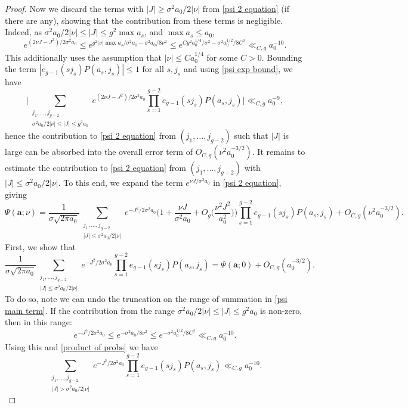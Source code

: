\documentclass[hidelinks,11pt,reqno]{amsart}
\renewcommand{\leq}{\leqslant}
\renewcommand{\geq}{\geqslant}
\newcommand{\ru}[1]{e_{g-1}(#1)}
\theoremstyle{remark}
\begin{document}
\begin{proof}
    Now we discard the terms with $|J|\geq \sigma^{2}a_{0}/2|\nu|$ from \cref{psi 2 equation} (if there are any), showing that the contribution from these terms is negligible. Indeed, as $\sigma^{2}a_{0}/2|\nu|\leq |J|\leq g^{2}\max a_{s}$, and $\max a_{s}\leq a_{0}$,
    \begin{equation}\label{psi exp bound}
        e^{(2\nu J-J^{2})/2\sigma^{2}a_{0}}\leq e^{g^{2}|\nu|\max a_{s}/\sigma^{2}a_{0} -\sigma^{2}a_{0}/8\nu^{2}}\leq e^{Cg^{2}a_{0}^{1/4}/\sigma^{2}-\sigma^{2}a_{0}^{1/2}/8C^{2}}\ll_{C,g} a_{0}^{-10}.
    \end{equation}
    This additionally uses the assumption that $|\nu|\leq Ca_{0}^{1/4}$ for some $C>0$. Bounding the term $|\ru{sj_{s}}P(a_{s},j_{s})|\leq 1$ for all $s, j_{s}$ and using \cref{psi exp bound}, we have
    \[\Big | \sum_{\substack{j_{1},\ldots, j_{g-2}\\ \sigma^{2}a_{0}/2|\nu|\leq|J|\leq g^{2}a_{0}}} e^{(2\nu J-J^{2})/2\sigma^{2}a_{0}}\prod_{s=1}^{g-2}\ru{sj_{s}}P(a_{s},j_{s})\Big |\ll_{C,g} a_{0}^{-9},\]
    hence the contribution to \cref{psi 2 equation} from $(j_{1},\ldots, j_{g-2})$ such that $|J|$ is large can be absorbed into the overall error term of $O_{C,g}(\nu^{2}a_{0}^{-3/2})$. It remains to estimate the contribution to \cref{psi 2 equation} from $(j_{1},\ldots, j_{g-2}) $ with $|J|\leq \sigma^{2}a_{0}/2|\nu|$. To this end, we expand the term $e^{\nu J/\sigma^{2}a_{0}}$ in \cref{psi 2 equation}, giving
    \begin{equation}\label{psi proof eq}
        \Psi(\mathbf{a};\nu)=\frac{1}{\sigma\sqrt{2\pi a_{0}}}\sum_{\substack{j_{1},\ldots, j_{g-2}\\|J|\leq \sigma^{2}a_{0}/2|\nu|}}e^{-J^{2}/2\sigma^{2}a_{0}}\Big (1+\frac{\nu J}{\sigma^{2}a_{0}}+O_{g}\Big(\frac{\nu^{2}J^{2}}{a_{0}^{2}}\Big)\Big )\prod_{s=1}^{g-2}\ru{sj_{s}}P(a_{s},j_{s})+O_{C,g}(\nu^{2}a_{0}^{-3/2}).
    \end{equation}
    First, we show that
    \begin{equation}\label{psi main term}
        \frac{1}{\sigma\sqrt{2\pi a_{0}}}\sum_{\substack{j_{1},\ldots, j_{g-2}\\|J|\leq \sigma^{2}a_{0}/2|\nu|}}e^{-J^{2}/2\sigma^{2}a_{0}}\prod_{s=1}^{g-2}\ru{sj_{s}}P(a_{s},j_{s})=\Psi(\mathbf{a};0)+O_{C,g}(a_{0}^{-3/2}).
    \end{equation}
    To do so, note we can undo the truncation on the range of summation in \cref{psi main term}. If the contribution from the range $\sigma^{2}a_{0}/2|\nu|\leq |J|\leq g^{2}a_{0}$ is non-zero, then in this range:
    \[e^{-J^{2}/2\sigma^{2}a_{0}}\leq e^{-\sigma^{2}a_{0}/8\nu^{2}}\leq e^{-\sigma^{2}a_{0}^{1/2}/8C^{2}}\ll_{C,g}a_{0}^{-10}.\]
    Using this and \cref{product of probs} we have
    \begin{equation}\label{range truncation}
        \sum_{\substack{j_{1},\ldots, j_{g-2}\\|J|> \sigma^{2}a_{0}/2|\nu|}}e^{-J^{2}/2\sigma^{2}a_{0}}\prod_{s=1}^{g-2}\ru{sj_{s}}P(a_{s},j_{s})\ll_{C,g} a_{0}^{-10}.
    \end{equation}
  

\end{proof}
\end{document}
